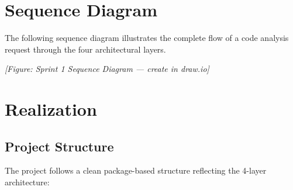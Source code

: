 \section{Sequence Diagram}

The following sequence diagram illustrates the complete flow of a code analysis request through the four architectural layers.



\textit{[Figure: Sprint 1 Sequence Diagram — create in draw.io]}

\section{Realization}

\subsection{Project Structure}

The project follows a clean package-based structure reflecting the 4-layer architecture:

